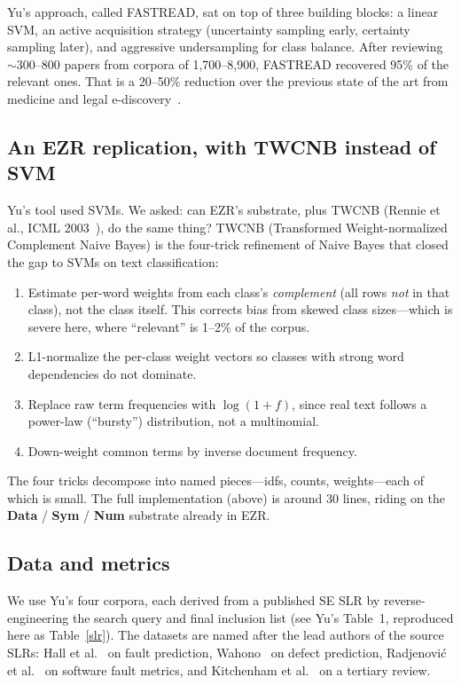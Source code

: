 \documentclass[AMA,STIX2COL]{WileyNJDv5}
\newcommand{\cls}[1]{%
  \setlength{\fboxsep}{1.5pt}%
  \colorbox{clsbg}{\sffamily\bfseries{#1}}%
}
\begin{document}
{Yu's approach, called FASTREAD, sat on top of three building
blocks: a linear SVM, an active acquisition strategy
(uncertainty sampling early, certainty sampling later), and
aggressive undersampling for class balance. After reviewing
$\sim$300--800 papers from corpora of 1{,}700--8{,}900,
FASTREAD recovered 95\% of the relevant ones. That is a
20--50\% reduction over the previous state of the art from
medicine and legal e-discovery~\cite{wallace2010,miwa2014,
cormack2014}.

\subsection*{An EZR replication, with TWCNB instead of SVM}

Yu's tool used SVMs. We asked: can EZR's substrate, plus
TWCNB (Rennie et al., ICML 2003~\cite{rennie2003}), do the
same thing? TWCNB (Transformed Weight-normalized Complement
Naive Bayes) is the four-trick refinement of Naive Bayes that
closed the gap to SVMs on text classification:
\begin{enumerate}
\item Estimate per-word weights from each class's
{\em complement} (all rows {\em not} in that class),
not the class itself. This corrects bias from skewed class
sizes---which is severe here, where ``relevant'' is 1--2\% of
the corpus.
\item L1-normalize the per-class weight vectors so classes
with strong word dependencies do not dominate.
\item Replace raw term frequencies with $\log(1+f)$, since
real text follows a power-law (``bursty'') distribution, not
a multinomial.
\item Down-weight common terms by inverse document frequency.
\end{enumerate}
The four tricks decompose into named pieces---\textsf{idfs},
\textsf{counts}, \textsf{weights}---each of which is small.
The full implementation (above) is around 30 lines, riding on
the \cls{Data}/\cls{Sym}/\cls{Num} substrate already in EZR.

\subsection*{Data and metrics}

We use Yu's four corpora, each derived from a published SE
SLR by reverse-engineering the search query and final
inclusion list (see Yu's Table~1, reproduced here as
Table~\ref{slr}). The datasets are named after the lead
authors of the source SLRs: Hall et al.~\cite{hall2012} on
fault prediction, Wahono~\cite{wahono2015} on defect
prediction, Radjenovi\'c et al.~\cite{radjenovic2013} on
software fault metrics, and Kitchenham et al.\
\cite{kitchenham2010} on a tertiary review.

}
\end{document}
